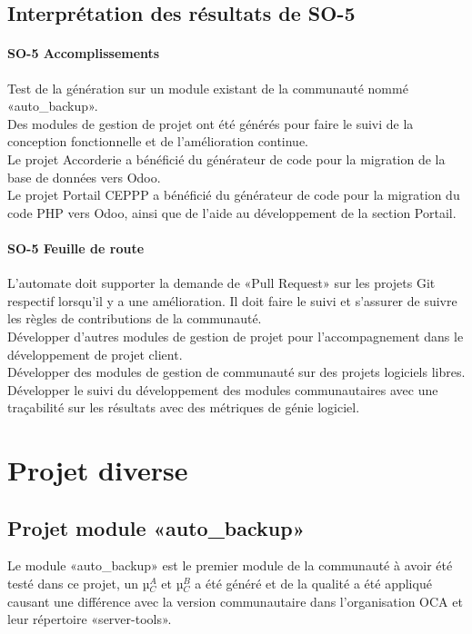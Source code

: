 \subsection{Interprétation des résultats de SO-5}

\paragraph{SO-5 Accomplissements}
Test de la génération sur un module existant de la communauté nommé «auto\_backup».\\
Des modules de gestion de projet ont été générés pour faire le suivi de la conception fonctionnelle et de l’amélioration continue.\\
Le projet Accorderie a bénéficié du générateur de code pour la migration de la base de données vers Odoo.\\
Le projet Portail CEPPP a bénéficié du générateur de code pour la migration du code PHP vers Odoo, ainsi que de l’aide au développement de la section Portail.

\paragraph{SO-5 Feuille de route}
L’automate doit supporter la demande de «Pull Request» sur les projets Git respectif lorsqu’il y a une amélioration. Il doit faire le suivi et s’assurer de suivre les règles de contributions de la communauté.\\
Développer d’autres modules de gestion de projet pour l’accompagnement dans le développement de projet client.\\
Développer des modules de gestion de communauté sur des projets logiciels libres.\\
Développer le suivi du développement des modules communautaires avec une traçabilité sur les résultats avec des métriques de génie logiciel.

\section{Projet diverse}

\subsection{Projet module «auto\_backup»}

Le module «auto\_backup» est le premier module de la communauté à avoir été testé dans ce projet, un µ$_C^A$ et µ$_C^B$ a été généré et de la qualité a été appliqué causant une différence avec la version communautaire dans l’organisation OCA et leur répertoire «server-tools».

